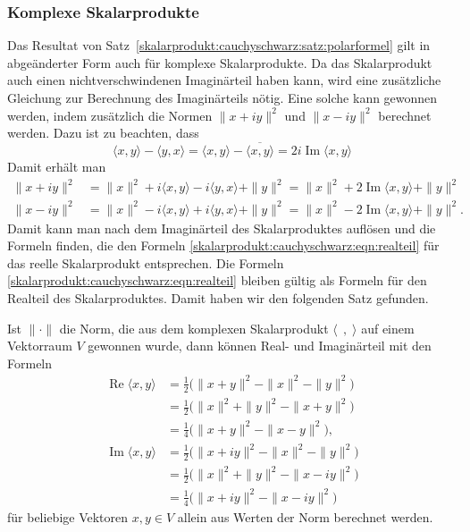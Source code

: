 %
%
\subsubsection{Komplexe Skalarprodukte}
Das Resultat von Satz~\ref{skalarprodukt:cauchyschwarz:satz:polarformel}
gilt in abgeänderter Form auch für komplexe Skalarprodukte.
Da das Skalarprodukt auch einen nichtverschwindenen Imaginärteil haben
kann, wird eine zusätzliche Gleichung zur Berechnung des Imaginärteils
nötig.
Eine solche kann gewonnen werden, indem zusätzlich die Normen
$\|x+iy\|^2$ und $\|x-iy\|^2$ berechnet werden.
Dazu ist zu beachten, dass
\[
\langle x,y\rangle
-
\langle y,x\rangle
=
\langle x,y\rangle
-
\overline{
\langle x,y\rangle
}
=
2i\operatorname{Im}\langle x,y\rangle
\]
Damit erhält man
\begin{align*}
\|x+iy\|^2 &= \|x\|^2 + i\langle x,y\rangle - i\langle y,x\rangle + \|y\|^2 
           = \|x\|^2 + 2\operatorname{Im}\langle x,y\rangle + \|y\|^2 \\
\|x-iy\|^2 &= \|x\|^2 - i\langle x,y\rangle + i\langle y,x\rangle + \|y\|^2 
           = \|x\|^2 - 2\operatorname{Im}\langle x,y\rangle + \|y\|^2.
\end{align*}
Damit kann man nach dem Imaginärteil des Skalarproduktes auflösen und
die Formeln
finden, die den Formeln
\eqref{skalarprodukt:cauchyschwarz:eqn:realteil}
für das reelle Skalarprodukt entsprechen.
Die Formeln
\eqref{skalarprodukt:cauchyschwarz:eqn:realteil}
bleiben gültig als Formeln für den Realteil des Skalarproduktes.
Damit haben wir den folgenden Satz gefunden.

\begin{satz}
%
Ist $\|\cdot\|$ die Norm, die aus dem komplexen Skalarprodukt
$\langle\;\,,\;\rangle$ auf einem Vektorraum $V$ gewonnen wurde,
dann können Real- und Imaginärteil mit den Formeln
\begin{align*}
\operatorname{Re}\langle x,y\rangle
&=
{\textstyle\frac12}\bigl(
\|x+y\|^2 - \|x\|^2 -\|y\|^2
\bigr)
\\
&=
{\textstyle\frac12}\bigl(
\|x\|^2 +\|y\|^2 - \|x+y\|^2
\bigr)
\\
&=
{\textstyle\frac14}\bigl(
\|x+y\|^2 - \|x-y\|^2
\bigr),
\\
\operatorname{Im}\langle x,y\rangle
&=
{\textstyle\frac12}\bigl(
\|x+iy\|^2-\|x\|^2-\|y\|^2
\bigr)
\\
&=
{\textstyle\frac12}\bigl(
\|x\|^2+\|y\|^2-\|x-iy\|^2
\bigr)
\\
&=
{\textstyle\frac14}\bigl(
\|x+iy\|^2
-
\|x-iy\|^2
\bigr)
\end{align*}
für beliebige Vektoren $x,y\in V$
allein aus Werten der Norm berechnet werden.
\end{satz}

